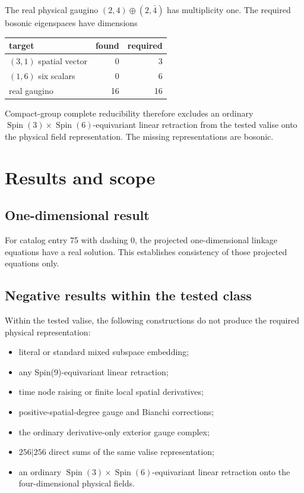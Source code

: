 \documentclass[11pt]{article}
\begin{document}
The real physical gaugino $(2,4)\oplus(2,\bar4)$ has multiplicity one.  The
required bosonic eigenspaces have dimensions

\begin{center}
\begin{tabular}{@{}lrr@{}}
\toprule
target & found & required \\
\midrule
$(3,1)$ spatial vector & 0 & 3 \\
$(1,6)$ six scalars & 0 & 6 \\
real gaugino & 16 & 16 \\
\bottomrule
\end{tabular}
\end{center}

Compact-group complete reducibility therefore excludes an ordinary
$\operatorname{Spin}(3)\times\operatorname{Spin}(6)$-equivariant linear
retraction from the tested valise onto the physical field representation.  The
missing representations are bosonic.

\section{Results and scope}

\subsection{One-dimensional result}

For catalog entry 75 with dashing 0, the projected one-dimensional linkage
equations have a real solution.  This establishes consistency of those
projected equations only.

\subsection{Negative results within the tested class}

Within the tested valise, the following constructions do not produce the
required physical representation:

\begin{itemize}
  \item literal or standard mixed subspace embedding;
  \item any Spin(9)-equivariant linear retraction;
  \item time node raising or finite local spatial derivatives;
  \item positive-spatial-degree gauge and Bianchi corrections;
  \item the ordinary derivative-only exterior gauge complex;
  \item $256\vert256$ direct sums of the same valise representation;
  \item an ordinary
        $\operatorname{Spin}(3)\times\operatorname{Spin}(6)$-equivariant
        linear retraction onto the four-dimensional physical fields.
\end{itemize}
\end{document}
